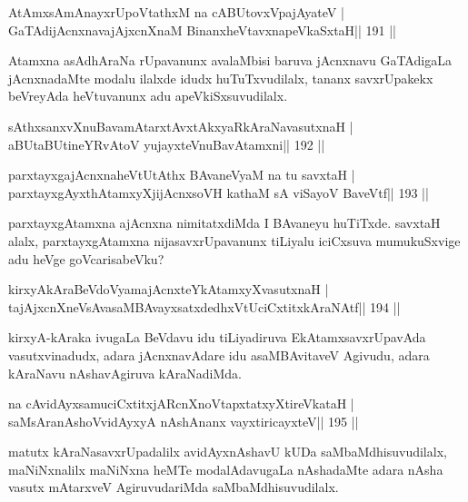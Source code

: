 
\begin{shl}
AtAmxsAmAnayxrUpoVtathxM na cABUtovxVpajAyateV |
GaTAdijAcnxnavajAjxcnXnaM BinanxheVtavxnapeVkaSxtaH\hfill || 191 ||
\end{shl}

\begin{artha}
Atamxna asAdhAraNa rUpavanunx avalaMbisi baruva jAcnxnavu GaTAdigaLa jAcnxnadaMte modalu ilalxde idudx huTuTxvudilalx, tananx savxrUpakekx beVreyAda heVtuvanunx adu apeVkiSxsuvudilalx.
\end{artha}


\begin{shl}
sAthxsanxvXnuBavamAtarxtAvxtAkxyaRkAraNavasutxnaH |
aBUtaBUtineYRvAtoV yujayxteV\s nuBavAtamxni\hfill || 192 ||
\end{shl}

\begin{shl}
parxtayxgajAcnxnaheVtUtAthx BAvaneVyaM na tu savxtaH |
parxtayxgAyxthAtamxyXjijAcnxsoVH kathaM sA viSayoV BaveVtf\hfill || 193 ||
\end{shl}

\begin{artha}
parxtayxgAtamxna ajAcnxna nimitatxdiMda I BAvaneyu huTiTxde. savxtaH alalx, parxtayxgAtamxna nijasavxrUpavanunx tiLiyalu iciCxsuva mumukuSxvige adu heVge goVcarisabeVku?
\end{artha}

\begin{shl}
kirxyAkAraBeVdoV\s yamajAcnxteYkAtamxyXvasutxnaH |
tajAjxcnXneV\s sAvasaMBAvayxsatxdedhxVtUciCxtitxkAraNAtf\hfill || 194 ||
\end{shl}

\begin{artha}
kirxyA-kAraka ivugaLa BeVdavu idu tiLiyadiruva EkAtamxsavxrUpavAda vasutxvinadudx, adara jAcnxnavAdare idu asaMBAvitaveV Agivudu, adara kAraNavu nAshavAgiruva kAraNadiMda.
\end{artha}

\begin{shl}
na cAvidAyxsamuciCxtitxjARcnXnoVtapxtatxyXtireVkataH |
saMsAranAshoV\s vidAyxyA nAshAnanx vayxtiricayxteV\hfill || 195 ||
\end{shl}

\begin{artha}
matutx kAraNasavxrUpadalilx avidAyxnAshavU kUDa saMbaMdhisuvudilalx, maNiNxnalilx maNiNxna heMTe modalAdavugaLa nAshadaMte adara nAsha vasutx mAtarxveV AgiruvudariMda saMbaMdhisuvudilalx.
\end{artha}

